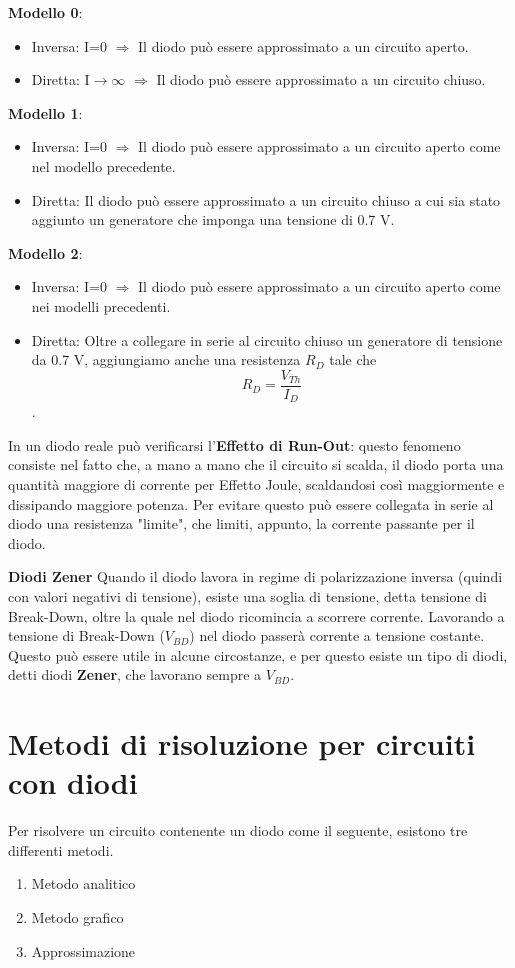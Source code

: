 \documentclass[\main/main.tex]{subfiles}
\begin{document}
\textbf{Modello 0}:
\begin{itemize} 
  	  \item Inversa: I=0  $\Rightarrow$ Il diodo può essere approssimato a un circuito aperto.
  	  \item Diretta: I$\rightarrow\infty$  $\Rightarrow$ Il diodo può essere approssimato a un circuito chiuso.
\end{itemize}
\textbf{Modello 1}:
\begin{itemize} 
  	  \item Inversa:  I=0  $\Rightarrow$  Il diodo può essere approssimato a un circuito aperto come nel modello precedente.
  	  \item Diretta: Il diodo può essere approssimato a un circuito chiuso a cui sia stato aggiunto un generatore che imponga una tensione di 0.7 V. 
\end{itemize} 
\textbf{Modello 2}:
\begin{itemize} 
  	  \item Inversa: I=0  $\Rightarrow$ Il diodo può essere approssimato a un circuito aperto come nei modelli precedenti.
  	  \item Diretta: Oltre a collegare in serie al circuito chiuso un generatore di tensione da 0.7 V, aggiungiamo anche una resistenza $R_D$ tale che \[R_D = \frac{V_{Th}}{I_D}\]. 
\end{itemize} 

In un diodo reale può verificarsi l'\textbf{Effetto di Run-Out}: questo fenomeno consiste nel fatto che, a mano a mano che il circuito si scalda, il diodo porta una quantità maggiore di corrente per Effetto Joule, scaldandosi così maggiormente e dissipando maggiore potenza. Per evitare questo può essere collegata in serie al diodo una resistenza "limite", che limiti, appunto, la corrente passante per il diodo. 


\textbf{Diodi Zener}
Quando il diodo lavora in regime di polarizzazione inversa (quindi con valori negativi di tensione), esiste una soglia di tensione, detta tensione di Break-Down, oltre la quale nel diodo ricomincia a scorrere corrente. 
Lavorando a tensione di Break-Down ($V_{BD}$) nel diodo passerà corrente a tensione costante. Questo può essere utile in alcune circostanze, e per questo esiste un tipo di diodi, detti diodi \textbf{Zener}, che lavorano sempre a $V_{BD}$. 


\section{Metodi di risoluzione per circuiti con diodi}
Per risolvere un circuito contenente un diodo come il seguente, esistono tre differenti metodi.
\begin{enumerate} 
	\item Metodo analitico
	\item Metodo grafico
	\item Approssimazione
\end{enumerate}
\end{document}
